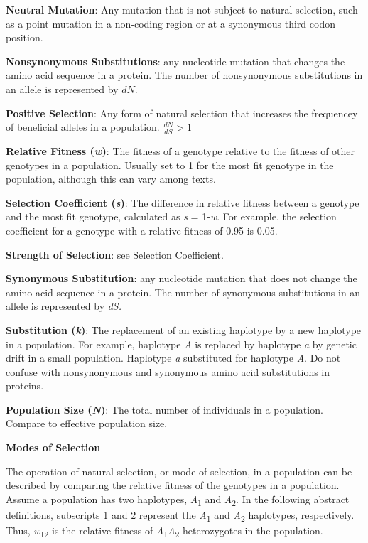 \documentclass[11pt]{article}
\begin{document}
\textbf{Neutral Mutation}: Any mutation that is not subject to natural
selection, such as a point mutation in a non-coding region or at a
synonymous third codon position.\medskip

\textbf{Nonsynonymous Substitutions}: any nucleotide mutation that
changes the amino acid sequence in a protein. The number of
nonsynonymous substitutions in an allele is represented by $dN$.\medskip

\textbf{Positive Selection}: Any form of natural selection that
increases the frequencey of beneficial alleles in a population. $\frac{dN}{dS} > 1$\medskip

\textbf{Relative Fitness (\emph{w})}: The fitness of a genotype relative
to the fitness of other genotypes in a population. Usually set to 1 for
the most fit genotype in the population, although this can vary among
texts.\medskip

\textbf{Selection Coefficient (\emph{s})}: The difference in relative
fitness between a genotype and the most fit genotype, calculated as
\emph{s} = 1-\emph{w}. For example, the selection coefficient for a
genotype with a relative fitness of 0.95 is 0.05.\medskip

\textbf{Strength of Selection}: see Selection Coefficient.\medskip

\textbf{Synonymous Substitution}: any nucleotide mutation that does not
change the amino acid sequence in a protein. The number of synonymous
substitutions in an allele is represented by \emph{dS.}\medskip

\textbf{Substitution (\emph{k})}: The replacement of an existing
haplotype by a new haplotype in a population. For example, haplotype
\emph{A} is replaced by haplotype \emph{a} by genetic drift in a small
population. Haplotype \emph{a} substituted for haplotype \emph{A}. Do
not confuse with nonsynonymous and synonymous amino acid substitutions
in proteins.\medskip

\textbf{Population Size (\emph{N})}: The total number of individuals in
a population. Compare to effective population size.\medskip

\textbf{Modes of Selection}\medskip

The operation of natural selection, or mode of selection, in a
population can be described by comparing the relative fitness of the
genotypes in a population. Assume a population has two haplotypes,
\emph{A}\textsubscript{1} and \emph{A}\textsubscript{2}. In the
following abstract definitions, subscripts 1 and 2 represent the
\emph{A}\textsubscript{1} and \emph{A}\textsubscript{2} haplotypes,
respectively. Thus, \emph{w}\textsubscript{12} is the relative fitness
of \emph{A}\textsubscript{1}\emph{A}\textsubscript{2} heterozygotes in
the population.\medskip
\end{document}
